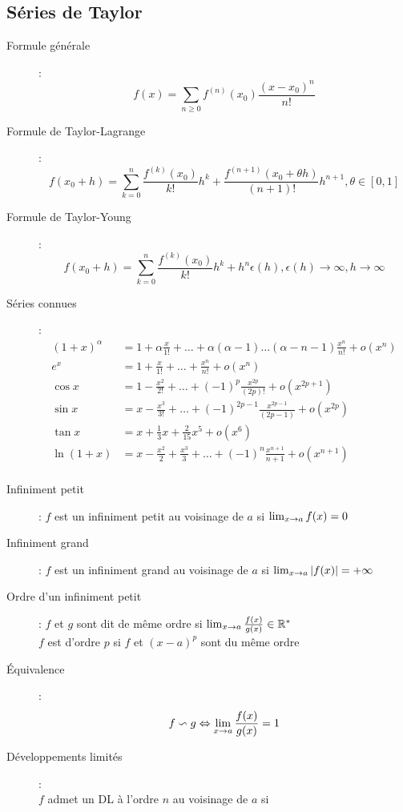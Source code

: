 \subsection{Séries de Taylor}
\begin{description}
\item[Formule générale] :
    \[ f(x)=\sum_{n\ge 0}f^{(n)}(x_0)\frac{(x-x_0)^n}{n!} \]
\item[Formule de Taylor-Lagrange] :
    \[
        f(x_0+h)=\sum_{k=0}^n\frac{f^{(k)}(x_0)}{k!}h^k+
        \frac{f^{(n+1)}(x_0+\theta h)}{(n+1)!}h^{n+1},\theta\in[0,1]
    \]
\item[Formule de Taylor-Young] :
    \[
        f(x_0+h)=\sum_{k=0}^n\frac{f^{(k)}(x_0)}{k!}h^k+
        h^n\epsilon(h), \epsilon(h)\longrightarrow\infty,
        h\longrightarrow\infty
    \]
\item[Séries connues] :
    \begin{align*}
        (1+x)^\alpha & =
        1+\alpha\frac{x}{1!}+\dots+\alpha(\alpha-1)\dots(\alpha-n-1)\frac{x^n}{n!}+o(x^n) \\
        e^x & =
        1+\frac{x}{1!}+\dots+\frac{x^n}{n!}+o(x^n)\\
        \cos x & =
        1-\frac{x^2}{2!}+\dots+(-1)^p\frac{x^{2p}}{(2p)!}+o(x^{2p+1})\\
        \sin x & =
        x-\frac{x^3}{3!}+\dots+(-1)^{2p-1}\frac{x^{2p-1}}{(2p-1)}+o(x^{2p})\\
        \tan x & =
        x+\frac{1}{3}x+\frac{2}{15}x^5+o(x^6)\\
        \ln(1+x) & =
        x-\frac{x^2}{2}+\frac{x^3}{3}+\dots+(-1)^n\frac{x^{n+1}}{n+1}+o(x^{n+1})\\
    \end{align*}
\item[Infiniment petit] : $f$ est un infiniment petit au voisinage de $a$ si
    $\lim_{x\rightarrow a}f(x)=0$
\item[Infiniment grand] : $f$ est un infiniment grand au voisinage de $a$ si
    $\lim_{x\rightarrow a}|f(x)|=+\infty$
\item[Ordre d'un infiniment petit] : $f$ et $g$ sont dit de même ordre si $\lim_{x\rightarrow a}\frac{f(x)}{g(x)}\in\mathbb{R}^*$
    \\$f$ est d'ordre $p$ si $f$ et $(x-a)^p$ sont du même ordre
\item[Équivalence] : 
    \[ f\backsim g\Leftrightarrow\lim_{x\rightarrow a}\frac{f(x)}{g(x)}=1 \]
\item[Développements limités] :
    \\$f$ admet un DL à l’ordre $n$ au voisinage de $a$ si

\end{description}
